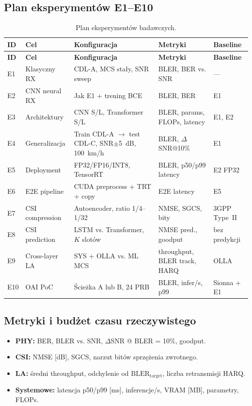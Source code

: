 \documentclass[12pt, a4paper]{article}
\begin{document}
\subsection{Plan eksperymentów E1--E10}

\begin{longtable}{@{}p{1.2cm} p{3.2cm} p{4.5cm} p{3.2cm} p{2.8cm}@{}}
\caption{Plan eksperymentów badawczych.}\label{tab:eksperymenty}\\
\toprule
\textbf{ID} & \textbf{Cel} & \textbf{Konfiguracja} & \textbf{Metryki} & \textbf{Baseline} \\
\midrule
\endfirsthead
\toprule
\textbf{ID} & \textbf{Cel} & \textbf{Konfiguracja} & \textbf{Metryki} & \textbf{Baseline} \\
\midrule
\endhead
E1 & Klasyczny RX & CDL-A, MCS stały, SNR sweep & BLER, BER vs. SNR & --- \\
E2 & CNN neural RX & Jak E1 + trening BCE & BLER, BER & E1 \\
E3 & Architektury & CNN S/L, Transformer S/L & BLER, params, FLOPs, latency & E1, E2 \\
E4 & Generalizacja & Train CDL-A $\rightarrow$ test CDL-C, SNR$\pm$5~dB, 100~km/h & BLER, $\Delta$SNR@10\% & E1 \\
E5 & Deployment & FP32/FP16/INT8, TensorRT & BLER, p50/p99 latency & E2 FP32 \\
E6 & E2E pipeline & CUDA preprocess + TRT + copy & E2E latency & E5 \\
E7 & CSI compression & Autoencoder, ratio 1/4--1/32 & NMSE, SGCS, bity & 3GPP Type~II \\
E8 & CSI prediction & LSTM vs. Transformer, $K$ slotów & NMSE pred., goodput & bez predykcji \\
E9 & Cross-layer LA & SYS + OLLA vs. ML MCS & throughput, BLER track, HARQ & OLLA \\
E10 & OAI PoC & Ścieżka A lub B, 24 PRB & BLER, infer/s, p99 & Sionna + E1 \\
\bottomrule
\end{longtable}

\subsection{Metryki i budżet czasu rzeczywistego}

\begin{itemize}[leftmargin=*]
    \item \textbf{PHY:} BER, BLER vs. SNR, $\Delta$SNR @ BLER = 10\%, goodput.
    \item \textbf{CSI:} NMSE [dB], SGCS, narzut bitów sprzężenia zwrotnego.
    \item \textbf{LA:} średni throughput, odchylenie od $\mathrm{BLER}_{\mathrm{target}}$, liczba retransmisji HARQ.
    \item \textbf{Systemowe:} latencja p50/p99 [ms], inferencje/s, VRAM [MB], parametry, FLOPs.
\end{itemize}
\end{document}
